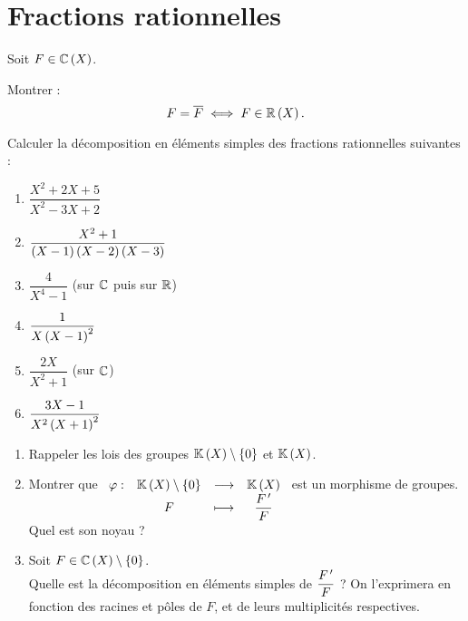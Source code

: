 \section{Fractions rationnelles}

\begin{exo}[Exercice 20]
Soit \(F\in\fracrat[\C]\).

Montrer : \[F=\conj{F}\ssi F\in\fracrat[\R].\]
\end{exo}

\begin{corr}
\end{corr}

\begin{exo}[Exercice 21]
Calculer la décomposition en éléments simples des fractions rationnelles suivantes :

\begin{enumerate}
\item \(\dfrac{X^2+2X+5}{X^2-3X+2}\) \\

\item \(\dfrac{X^2+1}{\left(X-1\right)\left(X-2\right)\left(X-3\right)}\) \\

\item \(\dfrac{4}{X^4-1}\) (sur \(\mathbb{C}\) puis sur \(\mathbb{R}\)) \\

\item \(\dfrac{1}{X\left(X-1\right)^2}\) \\

\item \(\dfrac{2X}{X^2+1}\) (sur \(\mathbb{C}\)) \\

\item \(\dfrac{3X-1}{X^2\left(X+1\right)^2}\)
\end{enumerate}
\end{exo}

\begin{corr}
\end{corr}

\begin{exo}[Exercice 22]
\begin{enumerate}
\item Rappeler les lois des groupes \(\fracrat\excluant\accol{0}\) et \(\fracrat\). \\

\item Montrer que \(\fonction{\phi}{\fracrat\excluant\accol{0}}{\fracrat}{F}{\dfrac{F\prim}{F}}\) est un morphisme de groupes. \\

Quel est son noyau ? \\

\item Soit \(F\in\fracrat[\C]\excluant\accol{0}\). \\

Quelle est la décomposition en éléments simples de \(\dfrac{F^{\,\prime}}{F}\) ? On l'exprimera en fonction des racines et pôles de \(F\), et de leurs multiplicités respectives.
\end{enumerate}
\end{exo}

